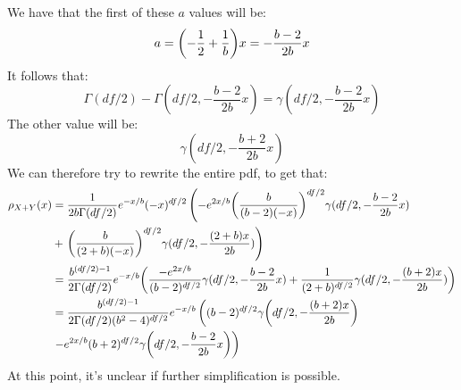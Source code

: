\documentclass{article}
\begin{document}
We have that the first of these $a$ values will be:
\begin{equation}
a = \pqty{-\frac{1}{2} + \frac{1}{b}}x = -\frac{b-2}{2b}x
\end{equation}
It follows that:
\begin{equation}
\Gamma(df/2) - \Gamma(df/2, -\frac{b-2}{2b}x) = \gamma(df/2, -\frac{b-2}{2b}x)
\end{equation}
The other value will be:
\begin{equation}
\gamma(df/2, -\frac{b+2}{2b}x)
\end{equation}
We can therefore try to rewrite the entire pdf, to get that:
\begin{align*}
\rho_{X+Y}(x) &=\frac{1}{2b\Gamma(df/2)}e^{-x/b}(-x)^{df/2}\left(-e^{2x/b}\pqty{\frac{b}{(b-2)(-x)}}^{df/2}\gamma(df/2, -\frac{b-2}{2b}x)\right. \\
&+\left.\pqty{\frac{b}{(2+b)(-x)}}^{df/2}\gamma(df/2,-\frac{(2+b)x}{2b})\right) \\
&=\frac{b^{(df/2)-1}}{2\Gamma(df/2)}e^{-x/b}\pqty{\frac{-e^{2x/b}}{(b-2)^{df/2}}\gamma(df/2, -\frac{b-2}{2b}x)+\frac{1}{(2+b)^{df/2}}\gamma(df/2,-\frac{(b+2)x}{2b})} \\
&=\frac{b^{(df/2)-1}}{2\Gamma(df/2)(b^2-4)^{df/2}}e^{-x/b}\left((b-2)^{df/2}\gamma\pqty{df/2,-\frac{(b+2)x}{2b}}\right. \\
&\left.-e^{2x/b}(b+2)^{df/2}\gamma\pqty{df/2, -\frac{b-2}{2b}x}\right)
\end{align*}
At this point, it's unclear if further simplification is possible.
\end{document}
